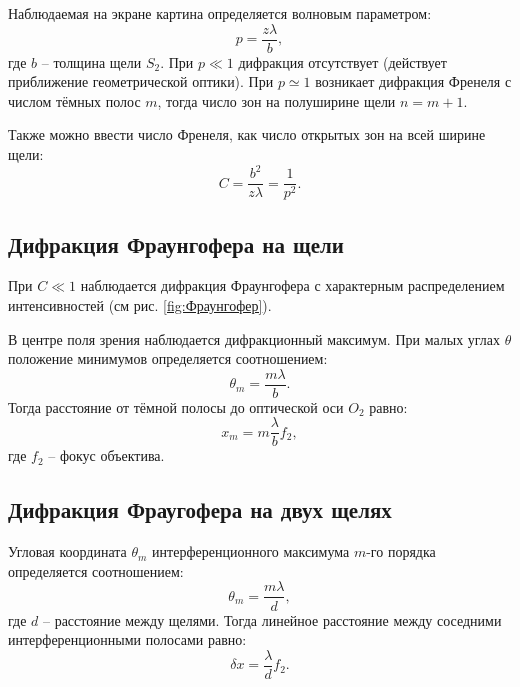 \documentclass[a4paper]{article}
\newcommand{\picref}[1]{рис. \ref{#1}}
\begin{document}
Наблюдаемая на экране картина определяется волновым параметром:
\begin{equation}\label{eq:волновойПараметр}
	p = \frac{z \lambda}{b},
\end{equation}
где $ b $ -- толщина щели $ S_2 $. При $ p\ll 1 $ дифракция отсутствует (действует приближение геометрической оптики). При $ p\simeq 1 $ возникает дифракция Френеля с числом тёмных полос $ m $, тогда число зон на полуширине щели $ n = m+1 $.

Также можно ввести число Френеля, как число открытых зон на всей ширине щели:
\begin{equation}\label{eq:числоФренеля}
	C = \frac{b^2}{z \lambda} = \frac{1}{p^2}.
\end{equation}

\subsection{Дифракция Фраунгофера на щели}

При $ C\ll 1  $ наблюдается дифракция Фраунгофера с характерным распределением интенсивностей (см \picref{fig:Фраунгофер}). 

В центре поля зрения наблюдается дифракционный максимум. При малых углах $ \theta $ положение минимумов определяется соотношением:
\begin{equation*}\label{key}
	\theta_m = \frac{m \lambda}{b}.
\end{equation*}
Тогда расстояние от тёмной полосы до оптической оси $ O_2 $ равно:
\begin{equation}\label{eq:ФраунгоферМинимумы}
	x_m = m \frac{\lambda}{b} f_2,
\end{equation}
где $ f_2 $ -- фокус объектива.

\subsection{Дифракция Фраугофера на двух щелях}

Угловая координата $ \theta_m $ интерференционного максимума $ m $-го порядка определяется соотношением:
\begin{equation*}\label{key}
	\theta_m = \frac{m \lambda}{d},
\end{equation*}
где $ d $ -- расстояние между щелями. Тогда линейное расстояние между соседними интерференционными полосами равно:
\begin{equation}\label{eq:ИнтерфПолосыФраунгоф2}
	\delta x = \frac{\lambda}{d} f_2.
\end{equation}
\end{document}
